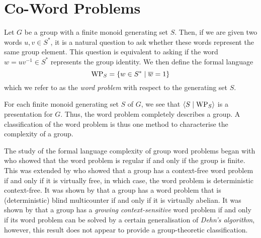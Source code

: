 \chapter{Co-Word Problems}\label{chp:coword-problems}

Let $G$ be a group with a finite monoid generating set $S$.
Then, if we are given two words $u,v \in S^*$, it is a natural question to ask whether these words represent the same group element.
This question is equivalent to asking if the word $w = uv^{-1} \in S^*$ represents the group identity.
We then define the formal language
\[
	\mathrm{WP}_S
	=
	\left\{
		w \in S^*
	\mid
		\overline{w} = 1
	\right\}
\]
which we refer to as the \emph{word problem} with respect to the generating set $S$.

For each finite monoid generating set $S$ of $G$, we see that $\left\langle S \mid \mathrm{WP}_S \right\rangle$ is a presentation for $G$.
Thus, the word problem completely describes a group.
A classification of the word problem is thus one method to characterise the complexity of a group.

The study of the formal language complexity of group word problems began with \textcite{anisimov1971} who showed that the word problem is regular if and only if the group is finite.
This was extended by \textcite{muller1983} who showed that a group has a context-free word problem if and only if it is virtually free, in which case, the word problem is deterministic context-free.
It was shown by \textcite{elder2008} that a group has a word problem that is (deterministic) blind multicounter if and only if it is virtually abelian.
It was shown by \textcite{holt2008} that a group has a \emph{growing context-sensitive} word problem if and only if its word problem can be solved by a certain generalisation of \emph{Dehn's algorithm}, however, this result does not appear to provide a group-theoretic classification.


